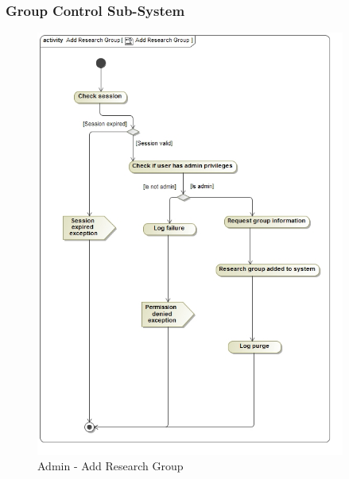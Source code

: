 \documentclass{article}
\begin{document}
			\subsubsection{Group Control Sub-System}
				\begin{figure}[H]
					\includegraphics[width=4in, center]{../Diagrams/Process Specifications/Group control subsystem/Add Research Group.jpg}
					\caption{Admin - Add Research Group}
				\end{figure}
\end{document}
